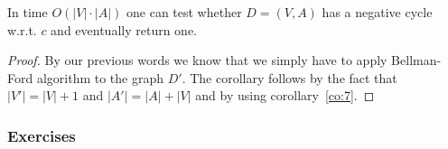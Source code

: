 \begin{corollary}
  \label{co:9}
  In time $O(|V| \cdot |A| )$  one can test whether $D = (V,A)$ has a
  negative cycle w.r.t. $c$ and eventually return one. 
\end{corollary}

\begin{proof}
   By our previous words we know that we simply have to apply 
   Bellman-Ford algorithm to the graph $D'$. The corollary follows 
   by the fact that $|V'| = |V|+1$ and $|A'| = |A| + |V|$ and by 
   using corollary~\ref{co:7}.
\end{proof}


\subsubsection*{Exercises}

